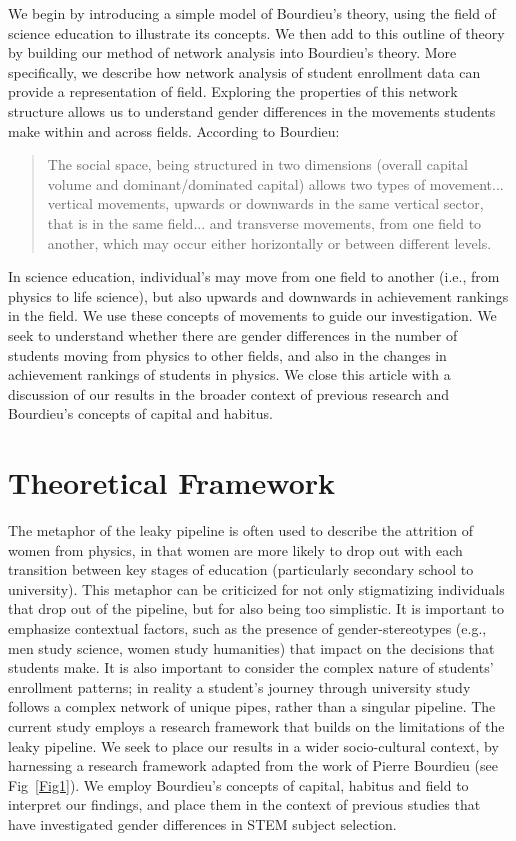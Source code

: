 We begin by introducing a simple model of Bourdieu's theory, using the field of science education to illustrate its concepts. We then add to this outline of theory by building our method of network analysis into Bourdieu's theory. More specifically, we describe how network analysis of student enrollment data can provide a representation of field. Exploring the properties of this network structure allows us to understand gender differences in the movements students make within and across fields. According to Bourdieu\cite{Bourdieu1984}: 
\begin{quote}
    The social space, being structured in two dimensions (overall capital volume and dominant/dominated capital) allows two types of movement... vertical movements, upwards or downwards in the same vertical sector, that is in the same field... and transverse movements, from one field to another, which may occur either horizontally or between different levels.
\end{quote} In science education, individual's may move from one field to another (i.e., from physics to life science), but also upwards and downwards in achievement rankings in the field. We use these concepts of movements to guide our investigation. We seek to understand whether there are gender differences in the number of students moving from physics to other fields, and also in the changes in achievement rankings of students in physics. We close this article with a discussion of our results in the broader context of previous research and Bourdieu's concepts of capital and habitus. 

\section{Theoretical Framework}
The metaphor of the leaky pipeline is often used to describe the attrition of women from physics\cite{Huyer2007, Schiebinger_2001}, in that women are more likely to drop out with each transition between key stages of education (particularly secondary school to university). This metaphor can be criticized for not only stigmatizing individuals that drop out of the pipeline, but for also being too simplistic.\cite{Cannady2014} It is important to emphasize contextual factors, such as the presence of gender-stereotypes\cite{Nosek_2009} (e.g., men study science, women study humanities) that impact on the decisions that students make. It is also important to consider the complex nature of students' enrollment patterns; in reality a student's journey through university study follows a complex network of unique pipes, rather than a singular pipeline. The current study employs a research framework that builds on the limitations of the leaky pipeline. We seek to place our results in a wider socio-cultural context, by harnessing a research framework adapted from the work of Pierre Bourdieu\cite{Bourdieu1984} (see Fig~\ref{Fig1}). We employ Bourdieu's concepts of capital, habitus and field to interpret our findings, and place them in the context of previous studies that have investigated gender differences in STEM subject selection. 


